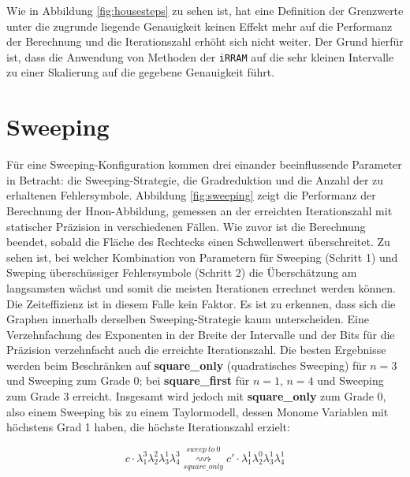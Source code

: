 
Wie in Abbildung \ref{fig:housesteps} zu sehen ist, hat eine Definition der Grenzwerte unter die zugrunde liegende Genauigkeit keinen Effekt mehr auf die Performanz der Berechnung und die Iterationszahl erhöht sich nicht weiter. Der Grund hierfür ist, dass die Anwendung von Methoden der \verb+iRRAM+ auf die sehr kleinen Intervalle zu einer Skalierung auf die gegebene Genauigkeit führt.

\section{Sweeping}
 Für eine Sweeping-Konfiguration kommen drei einander beeinflussende Parameter in Betracht: die Sweeping-Strategie, die Gradreduktion und die Anzahl der zu erhaltenen Fehlersymbole. 
 Abbildung \ref{fig:sweeping} zeigt die Performanz der Berechnung der H\e non-Abbildung, gemessen an der erreichten Iterationszahl mit statischer Präzision in verschiedenen Fällen. Wie zuvor ist die Berechnung beendet, sobald die Fläche des Rechtecks einen Schwellenwert überschreitet. Zu sehen ist, bei welcher Kombination von Parametern für Sweeping (Schritt 1) und Sweping überschüssiger Fehlersymbole (Schritt 2) die Überschätzung am langsamsten wächst und somit die meisten Iterationen errechnet werden können. Die Zeiteffizienz ist in diesem Falle kein Faktor. Es ist zu erkennen, dass sich die Graphen innerhalb derselben Sweeping-Strategie kaum unterscheiden. Eine Verzehnfachung des Exponenten in der Breite der Intervalle und der Bits für die Präzision verzehnfacht auch die erreichte Iterationszahl. Die besten Ergebnisse werden beim Beschränken auf \textbf{square\_only} (quadratisches Sweeping) für $n=3$ und Sweeping zum Grade 0; bei \textbf{square\_first} für $n=1$, $n=4$ und Sweeping zum Grade 3 erreicht. Insgesamt wird jedoch mit \textbf{square\_only} zum Grade 0, also einem Sweeping bis zu einem Taylormodell, dessen Monome Variablen mit höchstens Grad 1 haben, die höchste Iterationszahl erzielt:

$$ c \cdot \lambda_1^3 \lambda_2^2 \lambda_3^1 \lambda_4^3  \underset{square\_only}{\overset{sweep\ to\ 0}{\rightsquigarrow}} c' \cdot \lambda_1^1 \lambda_2^0 \lambda_3^1 \lambda_4^1$$



